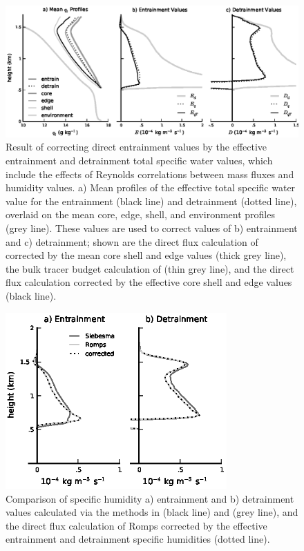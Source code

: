 \documentclass[draft,grl]{agutex}
\begin{document}
\begin{figure}
  \label{fig:reynolds_correction}
  \noindent\includegraphics[width=39pc]{./figures/reynolds_correction}
  \caption{Result of correcting direct entrainment values by the effective 
  entrainment and detrainment total specific water values, which include the 
  effects of Reynolds correlations between mass fluxes and humidity values.
  a) Mean profiles of the effective total specific water value for 
  the entrainment (black line) and detrainment (dotted line), overlaid on the 
  mean core, edge, shell, and environment profiles (grey line).  These 
  values are used to correct values of b) entrainment and c) detrainment; shown 
  are the direct flux calculation of \cite{Romps2010} corrected by the mean 
  core shell and edge values (thick grey line), the bulk tracer budget 
  calculation of \cite{Siebesma1995} (thin grey line), and the direct flux 
  calculation corrected by the effective core shell and edge values (black 
  line).}
\end{figure}

\begin{figure}
  \label{fig:numerical_correction}
  \noindent\includegraphics[width=20pc]{./figures/numerical_correction}
  \caption{Comparison of specific humidity a) entrainment and b) detrainment 
  values calculated via the methods in \cite{Siebesma1995} (black line) and 
  \cite{Romps2010} (grey line), and the direct flux calculation of Romps 
  corrected by the effective entrainment and detrainment specific humidities
  (dotted line).
  }
\end{figure}
\end{document}
